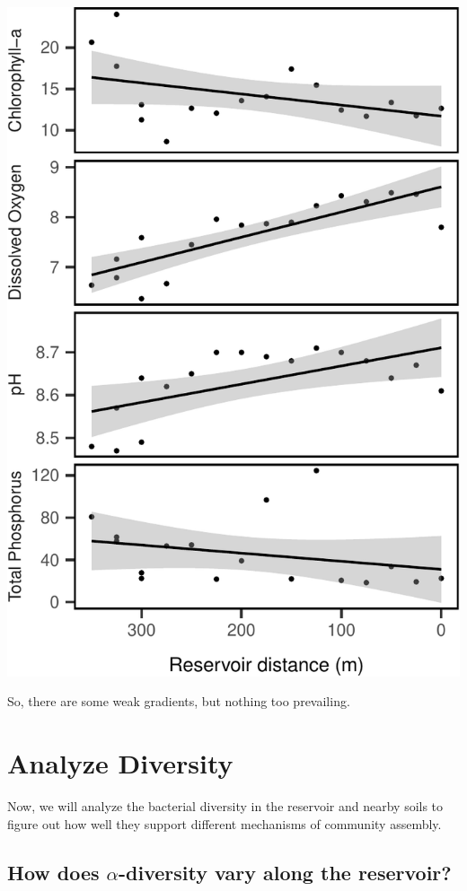 \documentclass[]{article}
\begin{document}
\begin{center}\includegraphics{ReservoirGradient_files/figure-latex/env_plot-1} \end{center}

So, there are some weak gradients, but nothing too prevailing.

\section{Analyze Diversity}\label{analyze-diversity}

Now, we will analyze the bacterial diversity in the reservoir and nearby
soils to figure out how well they support different mechanisms of
community assembly.

\subsection{\texorpdfstring{How does \(\alpha\)-diversity vary along the
reservoir?}{How does \textbackslash{}alpha-diversity vary along the reservoir?}}\label{how-does-alpha-diversity-vary-along-the-reservoir}
\end{document}

